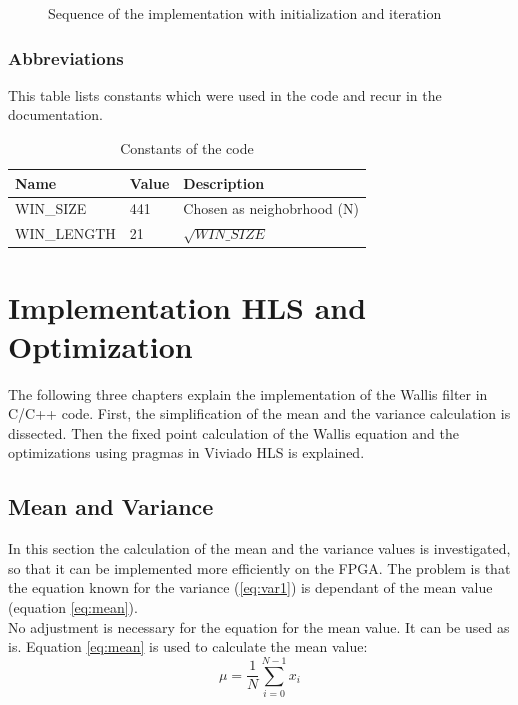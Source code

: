 \begin{figure}[tb!]
    \centering
    \begin{adjustbox}{max width=\textwidth}
        
    \end{adjustbox}
    \caption{Sequence of the implementation with initialization and iteration}
    \label{fig:sequence}
\end{figure}

\subsubsection*{Abbreviations}
This table lists constants which were used in the code and recur in the documentation.

\begin{table}[tb!]
    \centering
    \begin{tabular}{l l l}
        \toprule
        Name & Value & Description  \\
        \midrule
        WIN\_SIZE & 441 & Chosen as neighobrhood (N)
        \\
        WIN\_LENGTH & 21 & $\sqrt{WIN\_SIZE}$ 
        \\
        \bottomrule
    \end{tabular}
    \caption{Constants of the code}
    \label{tab:c_div}
\end{table}


\section{Implementation HLS and Optimization} \label{ch:ip:hls_opt}
The following three chapters explain the implementation of the Wallis filter in C/C++ code. First, the simplification of the mean and the variance calculation is dissected. Then the fixed point calculation of the Wallis equation and the optimizations using pragmas in Viviado HLS is explained.

\subsection{Mean and Variance} \label{ch:ip:mean_var}
In this section the calculation of the mean and the variance values is
investigated, so that it can be implemented more efficiently on the FPGA. The problem is that the equation known for the variance (\ref{eq:var1}) is dependant of the mean value (equation \ref{eq:mean}).\\
No adjustment is necessary for the equation for the mean value. It can be used as is. Equation \ref{eq:mean} is used to calculate the mean value:
\begin{equation}
    \mu = \frac{1}{N} \sum_{i = 0}^{N - 1} x_{i}
    \label{eq:mean}
\end{equation} 

